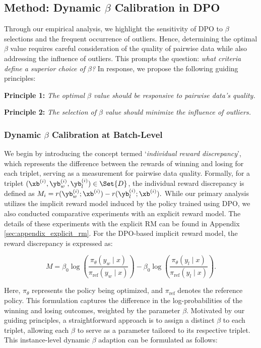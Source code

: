 \subsection{Method: Dynamic $\beta$ Calibration in DPO}

Through our empirical analysis, we highlight the sensitivity of DPO to $\beta$ selections and the frequent occurrence of outliers. Hence, 
determining the optimal $\beta$ value requires careful consideration of the quality of pairwise data while also addressing the influence of outliers. This prompts the question: \textit{what criteria define a superior choice of $\beta$?} In response, we propose the following guiding principles:

\textbf{Principle 1:} \textit{The optimal $\beta$ value should be responsive to pairwise data's quality.}

\textbf{Principle 2:} \textit{The selection of $\beta$ value should minimize the influence of outliers.}

\subsubsection{Dynamic $\beta$ Calibration at Batch-Level}
We begin by introducing the concept termed `\textit{individual reward discrepancy}', which represents the difference between the rewards of winning and losing for each triplet, serving as a measurement for pairwise data quality. Formally, for a triplet $(\xb^{(i)}, \yb_w^{(i)}, \yb_l^{(i)}) \in \Set{D}$, the individual reward discrepancy is defined as 
$M_i = r(\yb_w^{(i)};\xb^{(i)}) - r(\yb_l^{(i)};\xb^{(i)}).$
While our primary analysis utilizes the implicit reward model induced by the policy trained using DPO, we also conducted comparative experiments with an explicit reward model. The details of these experiments with the explicit RM can be found in Appendix \ref{sec:appendix_explicit_rm}. For the DPO-based implicit reward model, the reward discrepancy is expressed as:

$$ M = \beta_0 \log \left( \frac{\pi_\theta (y_w \mid x) }{\pi_{\text{ref}}(y_w \mid x)} \right) - \beta_0 \log \left( \frac{\pi_\theta (y_l \mid x) }{\pi_{\text{ref}}(y_l \mid x)} \right). $$

Here, \(\pi_\theta\) represents the policy being optimized, and \(\pi_{\text{ref}}\) denotes the reference policy. This formulation captures the difference in the log-probabilities of the winning and losing outcomes, weighted by the parameter \(\beta\).
Motivated by our guiding principles, a straightforward approach is to assign a distinct $\beta$ to each triplet, allowing each $\beta$ to serve as a parameter tailored to its respective triplet. This instance-level dynamic $\beta$ adaption can be formulated as follows:


